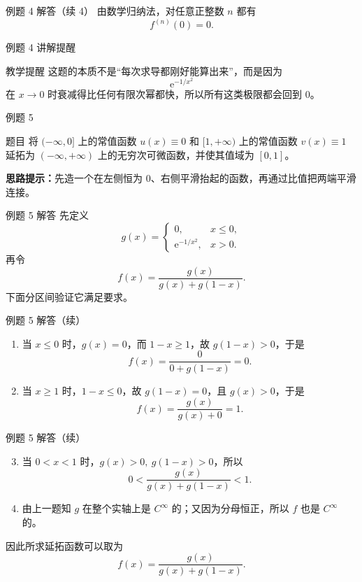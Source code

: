 ﻿\documentclass[aspectratio=169,10pt]{ctexbeamer}
\newcommand{\e}{\mathrm{e}}
\begin{document}
\begin{frame}[t]{例题 4 解答（续 4）}
\small
由数学归纳法，对任意正整数 $n$ 都有
\[
\boxed{f^{(n)}(0)=0.}
\]
\end{frame}

\begin{frame}[t]{例题 4 讲解提醒}
\small
\begin{block}{教学提醒}
这题的本质不是“每次求导都刚好能算出来”，而是因为
\[
\e^{-1/x^2}
\]
在 $x\to0$ 时衰减得比任何有限次幂都快，所以所有这类极限都会回到 $0$。
\end{block}
\end{frame}

\begin{frame}[t]{例题 5}
\small
\begin{block}{题目}
将 $(-\infty,0]$ 上的常值函数 $u(x)\equiv0$ 和 $[1,+\infty)$ 上的常值函数 $v(x)\equiv1$ 延拓为 $(-\infty,+\infty)$ 上的无穷次可微函数，并使其值域为 $[0,1]$。
\end{block}

\vspace{0.4em}
\textbf{思路提示：}先造一个在左侧恒为 $0$、右侧平滑抬起的函数，再通过比值把两端平滑连接。
\end{frame}

\begin{frame}[t]{例题 5 解答}
\small
先定义
\[
g(x)=
\begin{cases}
0, & x\le0,\\
\e^{-1/x^2}, & x>0.
\end{cases}
\]
再令
\[
f(x)=\frac{g(x)}{g(x)+g(1-x)}.
\]
下面分区间验证它满足要求。
\end{frame}

\begin{frame}[t]{例题 5 解答（续）}
\small
\begin{enumerate}
  \item 当 $x\le0$ 时，$g(x)=0$，而 $1-x\ge1$，故 $g(1-x)>0$，于是
  \[
  f(x)=\frac{0}{0+g(1-x)}=0.
  \]
  \item 当 $x\ge1$ 时，$1-x\le0$，故 $g(1-x)=0$，且 $g(x)>0$，于是
  \[
  f(x)=\frac{g(x)}{g(x)+0}=1.
  \]
\end{enumerate}
\end{frame}

\begin{frame}[t]{例题 5 解答（续）}
\small
\begin{enumerate}
\setcounter{enumi}{2}
  \item 当 $0<x<1$ 时，$g(x)>0,\ g(1-x)>0$，所以
  \[
  0<\frac{g(x)}{g(x)+g(1-x)}<1.
  \]
  \item 由上一题知 $g$ 在整个实轴上是 $C^\infty$ 的；又因为分母恒正，所以 $f$ 也是 $C^\infty$ 的。
\end{enumerate}
因此所求延拓函数可以取为
\[
\boxed{f(x)=\frac{g(x)}{g(x)+g(1-x)}.}
\]
\end{frame}
\end{document}
